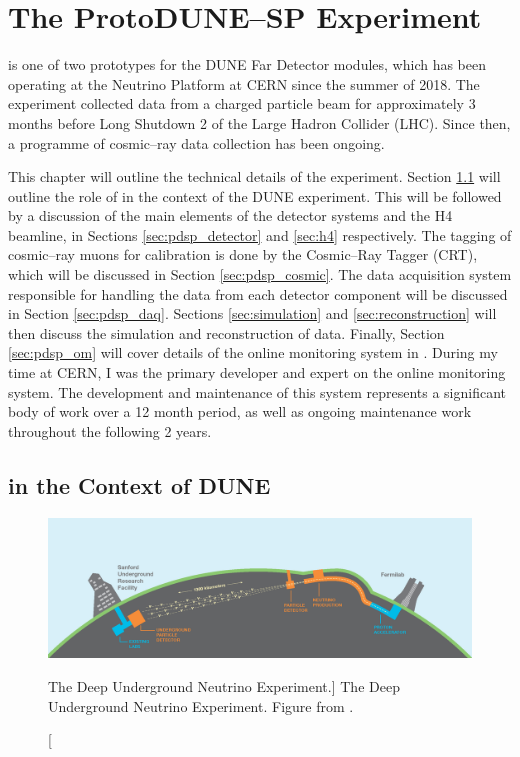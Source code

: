 \chapter{\label{ch:protodune}The ProtoDUNE--SP Experiment} 

\minitoc

\noindent
\protodune{} is one of two prototypes for the DUNE Far Detector modules, which 
has been operating at the Neutrino Platform at CERN since the summer of 2018. 
The experiment collected data from a charged particle beam for approximately 3 
months before Long Shutdown 2 of the Large Hadron Collider (LHC). Since then, a 
programme of cosmic--ray data collection has been ongoing.

This chapter will outline the technical details of the \protodune{} experiment.
Section \ref{sec:pdsp_dune} will outline the role of \protodune{} in the context
of the DUNE experiment. This will be followed by a discussion of the main
elements of the \protodune{} detector systems and the H4 beamline, in Sections 
\ref{sec:pdsp_detector} and \ref{sec:h4} respectively. The tagging of 
cosmic--ray muons for calibration is done by the Cosmic--Ray Tagger (CRT), 
which will be discussed in Section \ref{sec:pdsp_cosmic}. The data acquisition
system responsible for handling the data from each detector component will be
discussed in Section \ref{sec:pdsp_daq}. Sections \ref{sec:simulation} and 
\ref{sec:reconstruction} will then discuss the simulation and reconstruction 
of \protodune{} data. Finally, Section \ref{sec:pdsp_om} will cover details of 
the online monitoring system in \protodune{}. During my time at CERN, I was the 
primary developer and expert on the \protodune{} online monitoring system. The 
development and maintenance of this system represents a significant body of 
work over a 12 month period, as well as ongoing maintenance work throughout 
the following 2 years.

\section{\protodune{} in the Context of DUNE} \label{sec:pdsp_dune}

\begin{figure}

	\centering

	\includegraphics[width=\textwidth]{figures/dune_baseline.png}

	\caption
	[The Deep Underground Neutrino Experiment.]
	{The Deep Underground Neutrino Experiment. Figure from \cite{Abi:2020wmh}.}

	\label{fig:dune_baseline}

\end{figure}


